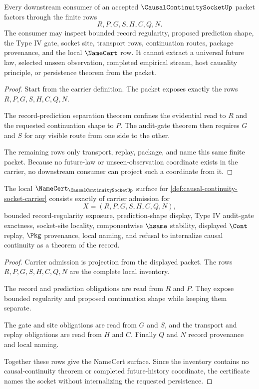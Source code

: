 \begin{theorem}
\label{thm:causal-continuity-socket-nonescape}
Every downstream consumer of an accepted $\CausalContinuitySocketUp$ packet factors through the finite rows
$$
R,P,G,S,H,C,Q,N.
$$
The consumer may inspect bounded record regularity, proposed prediction shape, the Type IV gate, socket site, transport rows, continuation routes, package provenance, and the local $\NameCert$ row. It cannot extract a universal future law, selected unseen observation, completed empirical stream, host causality principle, or persistence theorem from the packet.
\end{theorem}
\begin{proof}
Start from the carrier definition. The packet exposes exactly the rows $R,P,G,S,H,C,Q,N$.

The record-prediction separation theorem confines the evidential read to $R$ and the requested continuation shape to $P$. The audit-gate theorem then requires $G$ and $S$ for any visible route from one side to the other.

The remaining rows only transport, replay, package, and name this same finite packet. Because no future-law or unseen-observation coordinate exists in the carrier, no downstream consumer can project such a coordinate from it.
\end{proof}

\begin{theorem}
\label{thm:causal-continuity-socket-namecert-obligations}
The local $\NameCert_{\CausalContinuitySocketUp}$ surface for \autoref{def:causal-continuity-socket-carrier} consists exactly of carrier admission for
$$
X=(R,P,G,S,H,C,Q,N),
$$
bounded record-regularity exposure, prediction-shape display, Type IV audit-gate exactness, socket-site locality, componentwise $\hsame$ stability, displayed $\Cont$ replay, $\Pkg$ provenance, local naming, and refusal to internalize causal continuity as a theorem of the record.
\end{theorem}
\begin{proof}
Carrier admission is projection from the displayed packet. The rows $R,P,G,S,H,C,Q,N$ are the complete local inventory.

The record and prediction obligations are read from $R$ and $P$. They expose bounded regularity and proposed continuation shape while keeping them separate.

The gate and site obligations are read from $G$ and $S$, and the transport and replay obligations are read from $H$ and $C$. Finally $Q$ and $N$ record provenance and local naming.

Together these rows give the NameCert surface. Since the inventory contains no causal-continuity theorem or completed future-history coordinate, the certificate names the socket without internalizing the requested persistence.
\end{proof}

